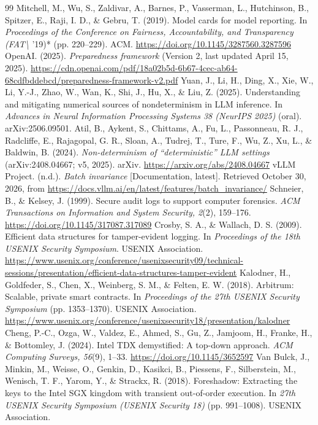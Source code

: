 \documentclass[11pt]{article}
\begin{document}
\begin{thebibliography}{99}
 Mitchell, M., Wu, S., Zaldivar, A., Barnes, P., Vasserman, L., Hutchinson, B., Spitzer, E., Raji, I. D., \& Gebru, T. (2019). Model cards for model reporting. In \emph{Proceedings of the Conference on Fairness, Accountability, and Transparency (FAT\textbackslash{}} '19)* (pp. 220--229). ACM. \url{https://doi.org/10.1145/3287560.3287596}
 OpenAI. (2025). \emph{Preparedness framework} (Version 2, last updated April 15, 2025). \url{https://cdn.openai.com/pdf/18a02b5d-6b67-4cec-ab64-68cdfbddebcd/preparedness-framework-v2.pdf}
 Yuan, J., Li, H., Ding, X., Xie, W., Li, Y.-J., Zhao, W., Wan, K., Shi, J., Hu, X., \& Liu, Z. (2025). Understanding and mitigating numerical sources of nondeterminism in LLM inference. In \emph{Advances in Neural Information Processing Systems 38 (NeurIPS 2025)} (oral). arXiv:2506.09501.
 Atil, B., Aykent, S., Chittams, A., Fu, L., Passonneau, R. J., Radcliffe, E., Rajagopal, G. R., Sloan, A., Tudrej, T., Ture, F., Wu, Z., Xu, L., \& Baldwin, B. (2024). \emph{Non-determinism of ``deterministic'' LLM settings} (arXiv:2408.04667; v5, 2025). arXiv. \url{https://arxiv.org/abs/2408.04667}
 vLLM Project. (n.d.). \emph{Batch invariance} [Documentation, latest]. Retrieved October 30, 2026, from \url{https://docs.vllm.ai/en/latest/features/batch_invariance/}
 Schneier, B., \& Kelsey, J. (1999). Secure audit logs to support computer forensics. \emph{ACM Transactions on Information and System Security, 2}(2), 159--176. \url{https://doi.org/10.1145/317087.317089}
 Crosby, S. A., \& Wallach, D. S. (2009). Efficient data structures for tamper-evident logging. In \emph{Proceedings of the 18th USENIX Security Symposium}. USENIX Association. \url{https://www.usenix.org/conference/usenixsecurity09/technical-sessions/presentation/efficient-data-structures-tamper-evident}
 Kalodner, H., Goldfeder, S., Chen, X., Weinberg, S. M., \& Felten, E. W. (2018). Arbitrum: Scalable, private smart contracts. In \emph{Proceedings of the 27th USENIX Security Symposium} (pp. 1353--1370). USENIX Association. \url{https://www.usenix.org/conference/usenixsecurity18/presentation/kalodner}
 Cheng, P.-C., Ozga, W., Valdez, E., Ahmed, S., Gu, Z., Jamjoom, H., Franke, H., \& Bottomley, J. (2024). Intel TDX demystified: A top-down approach. \emph{ACM Computing Surveys, 56}(9), 1--33. \url{https://doi.org/10.1145/3652597}
 Van Bulck, J., Minkin, M., Weisse, O., Genkin, D., Kasikci, B., Piessens, F., Silberstein, M., Wenisch, T. F., Yarom, Y., \& Strackx, R. (2018). Foreshadow: Extracting the keys to the Intel SGX kingdom with transient out-of-order execution. In \emph{27th USENIX Security Symposium (USENIX Security 18)} (pp. 991--1008). USENIX Association.

\end{thebibliography}
\end{document}

